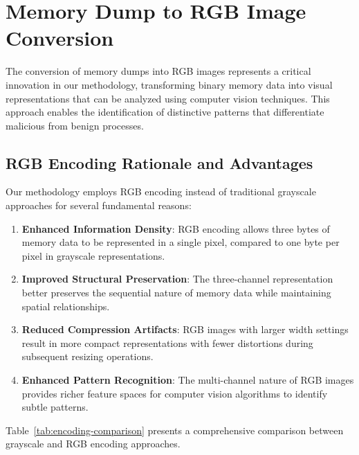 \section{Memory Dump to RGB Image Conversion}
\label{sec:rgb-conversion}

The conversion of memory dumps into RGB images represents a critical innovation in our methodology, transforming binary memory data into visual representations that can be analyzed using computer vision techniques. This approach enables the identification of distinctive patterns that differentiate malicious from benign processes.

\subsection{RGB Encoding Rationale and Advantages}
\label{subsec:rgb-rationale}

Our methodology employs RGB encoding instead of traditional grayscale approaches for several fundamental reasons:

\begin{enumerate}
    \item \textbf{Enhanced Information Density}: RGB encoding allows three bytes of memory data to be represented in a single pixel, compared to one byte per pixel in grayscale representations.
    
    \item \textbf{Improved Structural Preservation}: The three-channel representation better preserves the sequential nature of memory data while maintaining spatial relationships.
    
    \item \textbf{Reduced Compression Artifacts}: RGB images with larger width settings result in more compact representations with fewer distortions during subsequent resizing operations.
    
    \item \textbf{Enhanced Pattern Recognition}: The multi-channel nature of RGB images provides richer feature spaces for computer vision algorithms to identify subtle patterns.
\end{enumerate}

Table~\ref{tab:encoding-comparison} presents a comprehensive comparison between grayscale and RGB encoding approaches.

